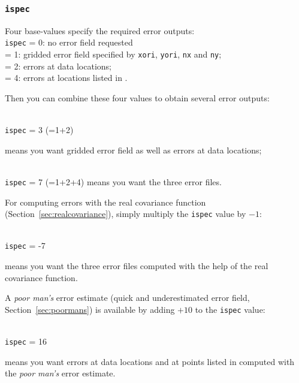                       
\subsubsection{\texttt{ispec}}

Four base-values specify the required error outputs:\\

\texttt{ispec}       = 0\qquad: no error field requested\\
  = 1\qquad: gridded error field specified by \texttt{xori}, \texttt{yori}, \texttt{nx} and \texttt{ny}; \\
  = 2\qquad: errors at data locations;\\
  = 4\qquad: errors at locations listed in .

Then you can combine these four values to obtain several error outputs: 

\examples\\
\texttt{ispec}             = 3 (=1+2)\hphantom{+4} \qquad \begin{minipage}[t]{.7\textwidth}means you want gridded error field as well as errors at data locations;\end{minipage}\\ 
\texttt{ispec}             = 7 (=1+2+4) \qquad means you want the three error files.


For computing errors with the real covariance function (Section~\ref{sec:realcovariance}), simply multiply the \texttt{ispec} value by $-1$:

\example\\
\texttt{ispec}             = -7 \qquad \begin{minipage}[t]{.7\textwidth}{means you want the three error files computed with the help of the real covariance function.}\end{minipage}


A \textit{poor man's} error estimate (quick and underestimated error field, Section~\ref{sec:poormans}) is available by adding $+10$ to the \texttt{ispec} value:

\example\\
\texttt{ispec}             = 16 \qquad \begin{minipage}[t]{.7\textwidth}{means you want errors at data locations and at points listed in  computed with the \textit{poor man's} error estimate.}\end{minipage}

